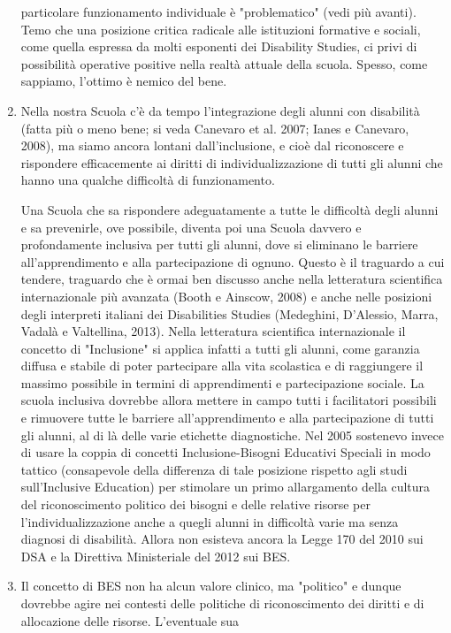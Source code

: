 \begin{enumerate}
	particolare funzionamento individuale è "problematico" (vedi più avanti). Temo che una posizione
	critica radicale alle istituzioni formative e sociali, come quella espressa da molti esponenti dei
	Disability Studies, ci privi di possibilità operative positive nella realtà attuale della scuola. Spesso,
	come sappiamo, l'ottimo è nemico del bene.
	\item Nella nostra Scuola c'è da tempo l'integrazione degli alunni con disabilità (fatta più o meno
	bene; si veda Canevaro et al. 2007; Ianes e Canevaro, 2008), ma siamo ancora lontani
	dall'inclusione, e cioè dal riconoscere e rispondere efficacemente ai diritti di individualizzazione di
	tutti gli alunni che hanno una qualche difficoltà di funzionamento.
	
	Una Scuola che sa rispondere adeguatamente a tutte le difficoltà degli alunni e sa prevenirle,
	ove possibile, diventa poi una Scuola davvero e profondamente inclusiva per tutti gli alunni, dove si
	eliminano le barriere all'apprendimento e alla partecipazione di ognuno. Questo è il traguardo a
	cui tendere, traguardo che è ormai ben discusso anche nella letteratura scientifica internazionale
	più avanzata (Booth e Ainscow, 2008) e anche nelle posizioni degli interpreti italiani dei Disabilities
	Studies (Medeghini, D'Alessio, Marra, Vadalà e Valtellina, 2013). Nella letteratura scientifica
	internazionale il concetto di "Inclusione" si applica infatti a tutti gli alunni, come garanzia diffusa e
	stabile di poter partecipare alla vita scolastica e di raggiungere il massimo possibile in termini di
	apprendimenti e partecipazione sociale. La scuola inclusiva dovrebbe allora mettere in campo tutti
	i facilitatori possibili e rimuovere tutte le barriere all'apprendimento e alla partecipazione di tutti
	gli alunni, al di là delle varie etichette diagnostiche. Nel 2005 sostenevo invece di usare la coppia di
	concetti Inclusione-Bisogni Educativi Speciali in modo tattico (consapevole della differenza di tale
	posizione rispetto agli studi sull'Inclusive Education) per stimolare un primo allargamento della
	cultura del riconoscimento politico dei bisogni e delle relative risorse per l'individualizzazione
	anche a quegli alunni in difficoltà varie ma senza diagnosi di disabilità. Allora non esisteva ancora la
	Legge 170 del 2010 sui DSA e la Direttiva Ministeriale del 2012 sui BES.
	\item Il concetto di BES non ha alcun valore clinico, ma "politico" e dunque dovrebbe agire nei
	contesti delle politiche di riconoscimento dei diritti e di allocazione delle risorse. L'eventuale sua

\end{enumerate}
